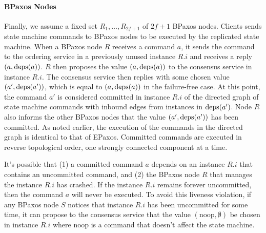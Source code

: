 \documentclass{mwhittaker}
\begin{document}
\paragraph{BPaxos Nodes}
Finally, we assume a fixed set $R_1, \ldots, R_{2f+1}$ of $2f + 1$ BPaxos
nodes.
%
Clients sends state machine commands to BPaxos nodes to be executed by the
replicated state machine. When a BPaxos node $R$ receives a command $a$, it
sends the command to the ordering service in a previously unused instance $R.i$
and receives a reply $(a, \text{deps}(a))$. $R$ then proposes the value $(a,
\text{deps}(a))$ to the consensus service in instance $R.i$. The consensus service
then replies with some chosen value $(a', \text{deps}(a'))$, which is equal to $(a,
\text{deps}(a))$ in the failure-free case. At this point, the command $a'$ is
considered committed in instance $R.i$ of the directed graph of state machine
commands with inbound edges from instances in $\text{deps}(a')$. Node $R$ also
informs the other BPaxos nodes that the value $(a', \text{deps}(a'))$ has been
committed. As noted earlier, the execution of the commands in the directed
graph is identical to that of EPaxos. Committed commands are executed in
reverse topological order, one strongly connected component at a time.

\newcommand{\noop}{\text{noop}}
It's possible that (1) a committed command $a$ depends on an instance $R.i$
that contains an uncommitted command, and (2) the BPaxos node $R$ that manages
the instance $R.i$ has crashed. If the instance $R.i$ remains forever
uncommitted, then the command $a$ will never be executed. To avoid this
liveness violation, if any BPaxos node $S$ notices that instance $R.i$ has been
uncommitted for some time, it can propose to the consensus service that the
value $(\noop, \emptyset)$ be chosen in instance $R.i$ where $\noop$ is a
command that doesn't affect the state machine.
\end{document}

